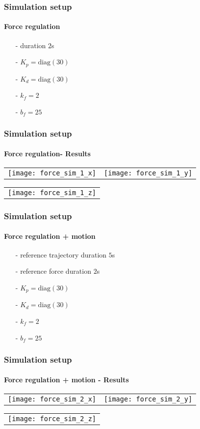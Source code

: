 \begin{frame}
  \frametitle{Simulation setup}
  \framesubtitle{Force regulation}
  \begin{itemize}
  \item[-] duration $2$s
  \item[-] $K_p = \mathrm{diag}(30)$
  \item[-] $K_d = \mathrm{diag}(30)$
  \item[-] $k_{f} = 2$
  \item[-] $b_f = 25$
  \end{itemize}
\end{frame}

\begin{frame}
  \frametitle{Simulation setup}
  \framesubtitle{Force regulation- Results}
  \begin{center}
   \vskip-0.1in
    \begin{tabular}{cc}
      \texttt{[image: force\_sim\_1\_x]} &
      \texttt{[image: force\_sim\_1\_y]}
    \end{tabular}
  \end{center}
  \begin{center}
   \vskip-0.1in
    \begin{tabular}{c}
      \texttt{[image: force\_sim\_1\_z]}
    \end{tabular}
  \end{center}
\end{frame}

\begin{frame}
  \frametitle{Simulation setup}
  \framesubtitle{Force regulation + motion}
  \begin{itemize}
  \item[-] reference trajectory duration $5$s
  \item[-] reference force duration $2$s
  \item[-] $K_p = \mathrm{diag}(30)$
  \item[-] $K_d = \mathrm{diag}(30)$
  \item[-] $k_{f} = 2$
  \item[-] $b_f = 25$
  \end{itemize}
\end{frame}

\begin{frame}
  \frametitle{Simulation setup}
  \framesubtitle{Force regulation + motion - Results}
  \begin{center}
   \vskip-0.1in
    \begin{tabular}{cc}
      \texttt{[image: force\_sim\_2\_x]} &
      \texttt{[image: force\_sim\_2\_y]}
    \end{tabular}
  \end{center}
  \begin{center}
   \vskip-0.1in
    \begin{tabular}{c}
      \texttt{[image: force\_sim\_2\_z]}
    \end{tabular}
  \end{center}
\end{frame}
